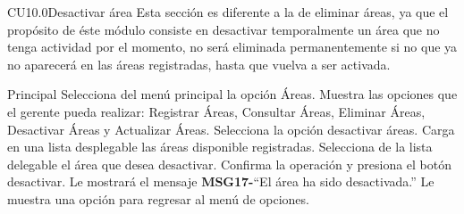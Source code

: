 

	\begin{UseCase}{CU10.0}{Desactivar área}{
		Esta sección es diferente a la de eliminar áreas, ya que el propósito de éste módulo consiste en desactivar temporalmente un área que no tenga actividad por el momento, no será eliminada permanentemente si no que ya no aparecerá en las áreas registradas, hasta que vuelva a ser activada.
	}
	\end{UseCase}

\begin{UCtrayectoria}{Principal}
		\UCpaso[\UCactor] Selecciona del menú principal la opción Áreas.
		\UCpaso Muestra las opciones que el gerente pueda realizar: Registrar Áreas, Consultar Áreas, Eliminar Áreas, Desactivar Áreas y Actualizar Áreas.
		\UCpaso[\UCactor] Selecciona la opción desactivar áreas.
		\UCpaso Carga en una lista desplegable las áreas disponible registradas.
		\UCpaso[\UCactor] Selecciona de la lista delegable el área que desea desactivar.
		\UCpaso[\UCactor] Confirma la operación y presiona el botón desactivar.
		\UCpaso Le mostrará el mensaje {\bf MSG17-}``El área ha sido desactivada.''
		\UCpaso Le muestra una opción para regresar al menú de opciones.
	\end{UCtrayectoria}

